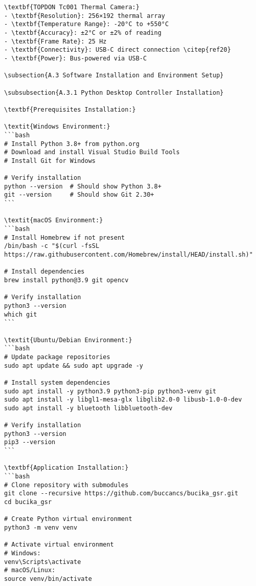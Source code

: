 \begin{verbatim}
\textbf{TOPDON Tc001 Thermal Camera:}
- \textbf{Resolution}: 256×192 thermal array
- \textbf{Temperature Range}: -20°C to +550°C
- \textbf{Accuracy}: ±2°C or ±2% of reading
- \textbf{Frame Rate}: 25 Hz
- \textbf{Connectivity}: USB-C direct connection \citep{ref20}
- \textbf{Power}: Bus-powered via USB-C

\subsection{A.3 Software Installation and Environment Setup}

\subsubsection{A.3.1 Python Desktop Controller Installation}

\textbf{Prerequisites Installation:}

\textit{Windows Environment:}
```bash
# Install Python 3.8+ from python.org
# Download and install Visual Studio Build Tools
# Install Git for Windows

# Verify installation
python --version  # Should show Python 3.8+
git --version     # Should show Git 2.30+
```

\textit{macOS Environment:}
```bash
# Install Homebrew if not present
/bin/bash -c "$(curl -fsSL https://raw.githubusercontent.com/Homebrew/install/HEAD/install.sh)"

# Install dependencies
brew install python@3.9 git opencv

# Verify installation
python3 --version
which git
```

\textit{Ubuntu/Debian Environment:}
```bash
# Update package repositories
sudo apt update && sudo apt upgrade -y

# Install system dependencies
sudo apt install -y python3.9 python3-pip python3-venv git
sudo apt install -y libgl1-mesa-glx libglib2.0-0 libusb-1.0-0-dev
sudo apt install -y bluetooth libbluetooth-dev

# Verify installation
python3 --version
pip3 --version
```

\textbf{Application Installation:}
```bash
# Clone repository with submodules
git clone --recursive https://github.com/buccancs/bucika_gsr.git
cd bucika_gsr

# Create Python virtual environment
python3 -m venv venv

# Activate virtual environment
# Windows:
venv\Scripts\activate
# macOS/Linux:
source venv/bin/activate


\end{verbatim}
